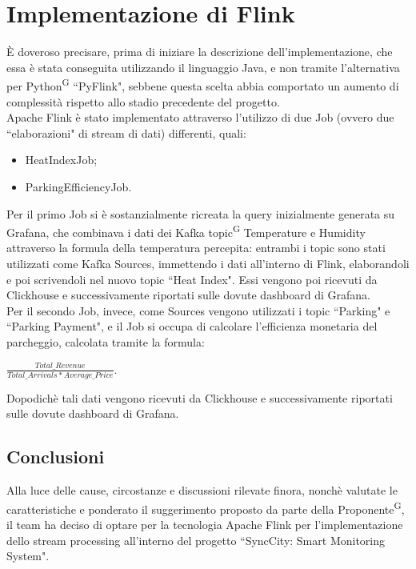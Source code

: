 \documentclass[8pt]{article}
\newcommand{\glossterm}[1]{#1\textsuperscript{G}} %
\begin{document}
\section{Implementazione di Flink}
È doveroso precisare, prima di iniziare la descrizione dell'implementazione, che essa è stata conseguita utilizzando il linguaggio Java, e non tramite l'alternativa
per \glossterm{Python} ``PyFlink", sebbene questa scelta abbia comportato un aumento di complessità rispetto allo stadio precedente del progetto.\\
Apache Flink è stato implementato attraverso l'utilizzo di due Job (ovvero due ``elaborazioni" di stream di dati) differenti, quali:
\begin{itemize}
	\item HeatIndexJob;
	\item ParkingEfficiencyJob.
\end{itemize}
Per il primo Job si è sostanzialmente ricreata la query inizialmente generata su Grafana, che combinava i dati dei Kafka \glossterm{topic} Temperature e Humidity attraverso 
la formula della temperatura percepita: entrambi i topic sono stati utilizzati come Kafka Sources, immettendo i dati all'interno di Flink, elaborandoli e poi scrivendoli 
nel nuovo topic ``Heat Index". Essi vengono poi ricevuti da Clickhouse e successivamente riportati sulle dovute dashboard di Grafana. \\
Per il secondo Job, invece, come Sources vengono utilizzati i topic ``Parking" e ``Parking Payment", e il Job si occupa di calcolare l'efficienza monetaria del parcheggio, calcolata tramite 
la formula:
\begin{center}
	$\frac{Total\_Revenue}{Total\_Arrivals * Average\_Price}$.
\end{center}
Dopodichè tali dati vengono ricevuti da Clickhouse e successivamente riportati sulle dovute dashboard di Grafana. 

\subsection{Conclusioni}
Alla luce delle cause, circostanze e discussioni rilevate finora, nonchè valutate le caratteristiche e ponderato il suggerimento proposto da parte della \glossterm{Proponente}, il team ha 
deciso di optare per la tecnologia Apache Flink per l'implementazione dello stream processing all'interno del progetto ``SyncCity: Smart Monitoring System".
\end{document}
